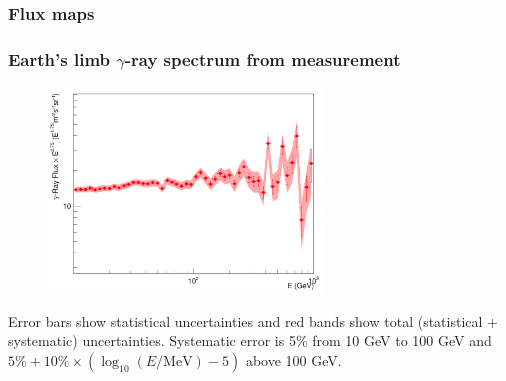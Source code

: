 \documentclass{beamer}
\begin{document}
\begin{frame}
  \frametitle{Flux maps}
  \begin{figure}[h!]
  \end{figure}
\end{frame}
  
  

\begin{frame}
  \frametitle{Earth's limb $\gamma$-ray spectrum from measurement}
  \begin{figure}[h!]
    \includegraphics[width=0.65\textwidth]{figure/gamma_spectrum}
  \end{figure}
  \small
  Error bars show statistical uncertainties and
  red bands show total (statistical + systematic) uncertainties.
  Systematic error is 5\% from 10 GeV to 100 GeV
  and $5\% + 10\%\times (\log_{10}(E/\text{MeV})-5)$ above 100 GeV.
\end{frame}
\end{document}

